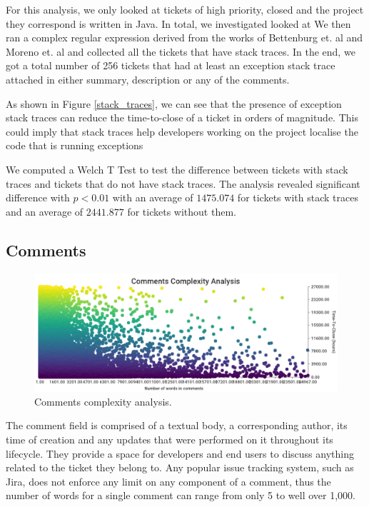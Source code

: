 \documentclass{mpaper}
\begin{document}
For this analysis, we only looked at tickets of high priority, closed and the project they correspond 
is written in Java. In total, we investigated looked at We then ran a complex regular expression derived from the works of Bettenburg et. al 
\cite{bettenburg2012using} and Moreno et. al \cite{moreno2014use} and collected all the tickets that have 
stack traces. In the end, we got a total number of 256 tickets that had at least an exception stack trace 
attached in either summary, description or any of the comments.

As shown in Figure \ref{stack_traces}, we can see that the presence of exception stack traces can 
reduce the time-to-close of a ticket in orders of magnitude. This could imply that stack traces help 
developers working on the project localise the code that is running exceptions 

We computed a Welch T Test to test the difference between tickets with stack traces and tickets that 
do not have stack traces. The analysis revealed significant difference with $p < 0.01$ with an
average of $1475.074$ for tickets with stack traces and an average of $2441.877$
for tickets without them.

\subsection{Comments}

\begin{figure}[ht]
  \begin{center}
    \includegraphics[scale=0.23]{images/comment_complexity.png}
  \end{center}
  \caption{\label{comments}Comments complexity analysis.}
\end{figure}

The comment field is comprised of a textual body, a corresponding author, its time of creation and any updates 
that were performed on it throughout its lifecycle. They provide a space for developers and end users to discuss 
anything related to the ticket they belong to. Any popular issue tracking system, such as Jira, does not enforce 
any limit on any component of a comment, thus the number of words for a single comment can range from only 5 
to well over 1,000. 
\end{document}
